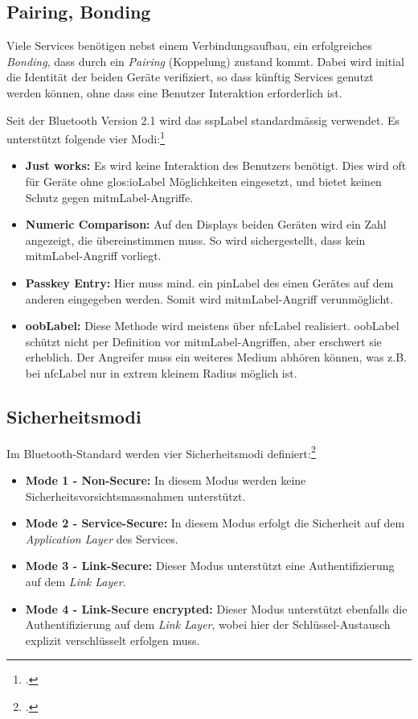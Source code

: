 \subsection{Pairing, Bonding}
Viele Services benötigen nebst einem Verbindungsaufbau, ein erfolgreiches \textit{Bonding}, dass durch ein \textit{Pairing} (Koppelung) zustand kommt.
Dabei wird initial die Identität der beiden Geräte verifiziert, so dass künftig Services genutzt werden können, ohne dass eine Benutzer Interaktion erforderlich ist.

Seit der Bluetooth Version 2.1 wird das \gls{sspLabel} standardmässig verwendet. Es unterstützt folgende vier Modi:\footcite{Bluetooth_Wikipedia_2015-04-17}
\begin{itemize}
	\item \textbf{Just works:} Es wird keine Interaktion des Benutzers benötigt. Dies wird oft für Geräte ohne \gls{glos:ioLabel} Möglichkeiten eingesetzt, und bietet keinen Schutz gegen \gls{mitmLabel}-Angriffe.
	\item \textbf{Numeric Comparison:} Auf den Displays beiden Geräten wird ein Zahl angezeigt, die übereinstimmen muss. So wird sichergestellt, dass kein \gls{mitmLabel}-Angriff vorliegt.
	\item \textbf{Passkey Entry:} Hier muss mind. ein \gls{pinLabel} des einen Gerätes auf dem anderen eingegeben werden. Somit wird \gls{mitmLabel}-Angriff verunmöglicht.
	\item \textbf{\gls{oobLabel}:} Diese Methode wird meistens über \gls{nfcLabel} realisiert.
		\gls{oobLabel} schützt nicht per Definition vor \gls{mitmLabel}-Angriffen, aber erschwert sie erheblich. Der Angreifer muss ein weiteres Medium abhören können, was z.B. bei \gls{nfcLabel} nur in extrem kleinem Radius möglich ist.
\end{itemize}


\subsection{Sicherheitsmodi}
Im Bluetooth-Standard werden vier Sicherheitsmodi definiert:\footcite{Security_Bluetooth_Development_Portal_2015-04-24}
\begin{itemize}
	\item \textbf{Mode 1 - Non-Secure:} In diesem Modus werden keine Sicherheitsvorsichtsmassnahmen unterstützt.
	\item \textbf{Mode 2 - Service-Secure:} In diesem Modus erfolgt die Sicherheit auf dem \textit{Application Layer} des Services.
	\item \textbf{Mode 3 - Link-Secure:} Dieser Modus unterstützt eine Authentifizierung auf dem \textit{Link Layer}.
	\item \textbf{Mode 4 - Link-Secure encrypted:} Dieser Modus unterstützt ebenfalls die Authentifizierung auf dem \textit{Link Layer}, wobei hier der Schlüssel-Austausch explizit verschlüsselt erfolgen muss.
\end{itemize}

